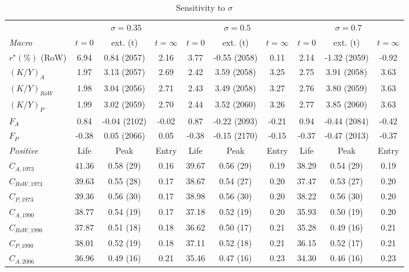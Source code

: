 \begin{table}[htbp]
\centering
\caption{Sensitivity to \(\sigma\)}
\label{tab:sens_sigma}
\footnotesize
\begin{tabular}{l ccc ccc ccc}
\toprule
 & \multicolumn{3}{c}{\(\sigma = 0.35\)} & \multicolumn{3}{c}{\(\sigma = 0.5\)} & \multicolumn{3}{c}{\(\sigma = 0.7\)} \\
\cmidrule(lr){2-4}\cmidrule(lr){5-7}\cmidrule(lr){8-10}
\textit{Macro} & \(t=0\) & ext. (t) & \(t=\infty\) & \(t=0\) & ext. (t) & \(t=\infty\) & \(t=0\) & ext. (t) & \(t=\infty\) \\
\midrule
\(r^{\star} (\%)\) (RoW) & 6.94 & 0.84 (2057) & 2.16 & 3.77 & -0.55 (2058) & 0.11 & 2.14 & -1.32 (2059) & -0.92 \\
\((K/Y)_{A}\) & 1.97 & 3.13 (2057) & 2.69 & 2.42 & 3.59 (2058) & 3.25 & 2.75 & 3.91 (2058) & 3.63 \\
\((K/Y)_{RoW}\) & 1.98 & 3.04 (2056) & 2.71 & 2.43 & 3.49 (2058) & 3.27 & 2.76 & 3.80 (2059) & 3.63 \\
\((K/Y)_{P}\) & 1.99 & 3.02 (2059) & 2.70 & 2.44 & 3.52 (2060) & 3.26 & 2.77 & 3.85 (2060) & 3.63 \\
\(F_{A}\) & 0.84 & -0.04 (2102) & -0.02 & 0.87 & -0.22 (2093) & -0.21 & 0.94 & -0.44 (2084) & -0.42 \\
\(F_{P}\) & -0.38 & 0.05 (2066) & 0.05 & -0.38 & -0.15 (2170) & -0.15 & -0.37 & -0.47 (2013) & -0.37 \\
\addlinespace
\textit{Positive} & Life & Peak & Entry & Life & Peak & Entry & Life & Peak & Entry \\
\midrule
\(C_{A,1973}\) & 41.36 & 0.58 (29) & 0.16 & 39.67 & 0.56 (29) & 0.19 & 38.29 & 0.54 (29) & 0.19 \\
\(C_{RoW,1973}\) & 39.63 & 0.55 (28) & 0.17 & 38.67 & 0.54 (27) & 0.20 & 37.47 & 0.53 (27) & 0.20 \\
\(C_{P,1973}\) & 39.36 & 0.56 (30) & 0.17 & 38.98 & 0.56 (30) & 0.20 & 38.22 & 0.56 (30) & 0.20 \\
\(C_{A,1990}\) & 38.77 & 0.54 (19) & 0.17 & 37.18 & 0.52 (19) & 0.20 & 35.93 & 0.50 (19) & 0.20 \\
\(C_{RoW,1990}\) & 37.87 & 0.51 (18) & 0.18 & 36.62 & 0.50 (17) & 0.21 & 35.28 & 0.49 (16) & 0.21 \\
\(C_{P,1990}\) & 38.01 & 0.52 (19) & 0.18 & 37.11 & 0.52 (18) & 0.21 & 36.15 & 0.52 (17) & 0.21 \\
\(C_{A,2006}\) & 36.96 & 0.49 (16) & 0.21 & 35.46 & 0.47 (16) & 0.23 & 34.30 & 0.46 (16) & 0.23 \\

\end{tabular}
\end{table}
